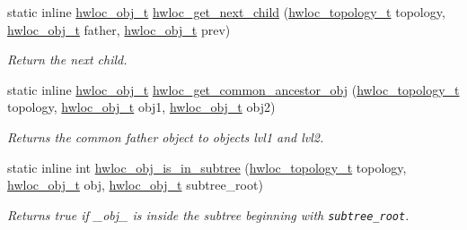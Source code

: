 \begin{CompactItemize}
static inline \hyperlink{structhwloc__obj}{hwloc\_\-obj\_\-t} \hyperlink{group__hwlocality__helper__traversal__basic_g3727d1e62843468ad3796fae52881512}{hwloc\_\-get\_\-next\_\-child} (\hyperlink{group__hwlocality__topology_g9d1e76ee15a7dee158b786c30b6a6e38}{hwloc\_\-topology\_\-t} topology, \hyperlink{structhwloc__obj}{hwloc\_\-obj\_\-t} father, \hyperlink{structhwloc__obj}{hwloc\_\-obj\_\-t} prev)
\begin{CompactList}\small\item\em Return the next child. \item\end{CompactList}\item 
static inline \hyperlink{structhwloc__obj}{hwloc\_\-obj\_\-t} \hyperlink{group__hwlocality__helper__traversal__basic_g58ba3d31ed79e7a1a47909824489d317}{hwloc\_\-get\_\-common\_\-ancestor\_\-obj} (\hyperlink{group__hwlocality__topology_g9d1e76ee15a7dee158b786c30b6a6e38}{hwloc\_\-topology\_\-t} topology, \hyperlink{structhwloc__obj}{hwloc\_\-obj\_\-t} obj1, \hyperlink{structhwloc__obj}{hwloc\_\-obj\_\-t} obj2)
\begin{CompactList}\small\item\em Returns the common father object to objects lvl1 and lvl2. \item\end{CompactList}\item 
static inline int \hyperlink{group__hwlocality__helper__traversal__basic_g810bf401a37f879f864aa1ab9d10b12f}{hwloc\_\-obj\_\-is\_\-in\_\-subtree} (\hyperlink{group__hwlocality__topology_g9d1e76ee15a7dee158b786c30b6a6e38}{hwloc\_\-topology\_\-t} topology, \hyperlink{structhwloc__obj}{hwloc\_\-obj\_\-t} obj, \hyperlink{structhwloc__obj}{hwloc\_\-obj\_\-t} subtree\_\-root)
\begin{CompactList}\small\item\em Returns true if \_\-obj\_\- is inside the subtree beginning with {\tt subtree\_\-root}. \item\end{CompactList}\end{CompactItemize}


